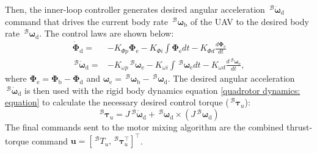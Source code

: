 \documentclass[lettersize,journal]{IEEEtran}
\begin{document}
Then, the inner-loop controller generates desired angular acceleration $\,^\mathcal{B} \dot{\boldsymbol{\omega}}_{\text{d}}$ command that drives the current body rate $\,^\mathcal{B} \boldsymbol{\omega}_{\text{b}}$ of the UAV to the desired body rate $\,^\mathcal{B} \boldsymbol{\omega}_{\text{d}}$.
The control laws are shown below:
\begin{align}
    \dot{\boldsymbol{\Phi}}_{\text{d}} =& - K_{\Phi p} \boldsymbol{\Phi}_{\text{e}} - K_{\Phi i} \int \boldsymbol{\Phi}_{\text{e}} dt - K_{\Phi d} \frac{d\boldsymbol{\Phi}_{\text{e}}}{dt} \nonumber \\
    \,^\mathcal{B} \dot{\boldsymbol{\omega}}_{\text{d}} =& - K_{\omega p} \,^\mathcal{B} \boldsymbol{\omega}_{\text{e}} - K_{\omega i} \int \,^\mathcal{B} \boldsymbol{\omega}_{\text{e}} dt - K_{\omega d} \frac{d\,^\mathcal{B} \boldsymbol{\omega}_{\text{e}}}{dt},
\end{align}
where $\boldsymbol{\Phi}_{\text{e}} = \boldsymbol{\Phi}_{\text{b}} - \boldsymbol{\Phi}_{\text{d}}$ and $\boldsymbol{\omega}_{\text{e}} = \,^\mathcal{B} \boldsymbol{\omega}_{\text{b}} - \,^\mathcal{B} \boldsymbol{\omega}_{\text{d}}$.
The desired angular acceleration $\,^\mathcal{B} \dot{\boldsymbol{\omega}}_{\text{d}}$ is then used with the rigid body dynamics equation \eqref{quadrotor dynamics: equation} to calculate the necessary desired control torque ($\,^\mathcal{B} \boldsymbol{\tau}_u$):
\begin{equation}
\label{tau_des: equation}
    \,^\mathcal{B} \boldsymbol{\tau}_u = J \,^\mathcal{B} \dot{\boldsymbol{\omega}}_{\text{d}} + \,^\mathcal{B} \boldsymbol{\omega}_{\text{d}} \times (J \,^\mathcal{B} \boldsymbol{\omega}_{\text{d}})
\end{equation}
The final commands sent to the motor mixing algorithm are the combined thrust-torque command $\boldsymbol{u} = [\,^\mathcal{B} {T}_u, \,^\mathcal{B} \boldsymbol{\tau}_u^\top]^\top$.
\end{document}
